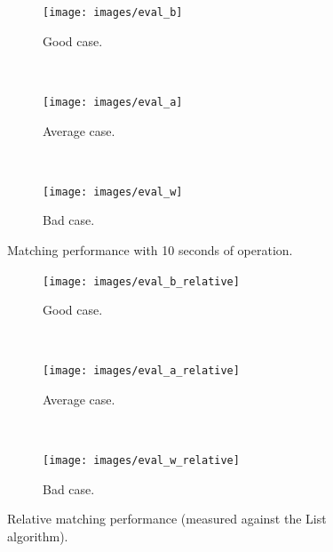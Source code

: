 \documentclass[a4paper,
		12pt,
		parskip=full,
		titlepage
		]{scrartcl}
\begin{document}
\begin{figure}
    \centering
    \begin{subfigure}{.45\linewidth}
        \centering
        \texttt{[image: images/eval\_b]}
        \caption{Good case.}
        \label{fig:eval_good_case}
    \end{subfigure}
    ~
    \begin{subfigure}{.45\linewidth}
        \centering
        \texttt{[image: images/eval\_a]}
        \caption{Average case.}
        \label{fig:eval_average_case}
    \end{subfigure}
    ~
    \begin{subfigure}{.45\linewidth}
        \centering
        \texttt{[image: images/eval\_w]}
        \caption{Bad case.}
        \label{fig:eval_bad_case}
    \end{subfigure}
    \caption{Matching performance with 10 seconds of operation.}
\end{figure}

\begin{figure}
    \centering
    \begin{subfigure}{.45\linewidth}
        \centering
        \texttt{[image: images/eval\_b\_relative]}
        \caption{Good case.}
        \label{fig:eval_good_case_relative}
    \end{subfigure}
    ~
    \begin{subfigure}{.45\linewidth}
        \centering
        \texttt{[image: images/eval\_a\_relative]}
        \caption{Average case.}
        \label{fig:eval_average_case_relative}
    \end{subfigure}
    ~
    \begin{subfigure}{.45\linewidth}
        \centering
        \texttt{[image: images/eval\_w\_relative]}
        \caption{Bad case.}
        \label{fig:eval_bad_case_relative}
    \end{subfigure}
    \caption{Relative matching performance (measured against the List algorithm).}
\end{figure}
\end{document}
